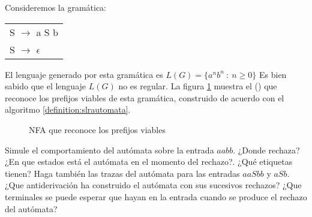 \begin{example}
\label{example:asb}
Consideremos la gramática:

\vspace{0.5cm}
\begin{center}
\begin{tabular}{l}
S      $\rightarrow$  a S b\\
S      $\rightarrow$ $\epsilon$ 
\end{tabular}
\end{center}
\vspace{0.25cm}

El lenguaje generado por esta gramática es $L(G) = \{ a^n b^n\ :\ n \ge 0 \}$
Es bien sabido que el lenguaje $L(G)$ no es regular.
La figura \ref{fig:nfa} muestra 
el  
()
que reconoce los prefijos viables de esta gramática, construido
de acuerdo con el algoritmo \ref{definition:slrautomata}.

\begin{center}
\begin{figure}[htb]
\caption{NFA que reconoce los prefijos viables}
\label{fig:nfa}
\end{figure}
\end{center}
\end{example}

\begin{exercise}
Simule el comportamiento del autómata sobre la entrada $aabb$. ¿Donde rechaza?
¿En que estados está el autómata en el momento del rechazo?. ¿Qué etiquetas tienen?
Haga también las
trazas del autómata para las entradas $aaSbb$ y $aSb$. ¿Que antiderivación 
ha construido el autómata con sus sucesivos rechazos? ¿Que terminales
se puede esperar que hayan en la entrada cuando se produce el rechazo
del autómata?
\end{exercise}


